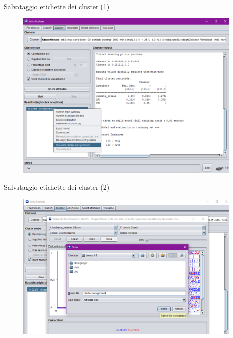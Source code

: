 \documentclass{beamer}
\begin{document}
\begin{frame}{Salvataggio etichette dei cluster (1)}
  \begin{figure}[bt]
    \begin{center}
    \includegraphics[width = 1\textwidth]{../img/save-cluster-ass-1.pdf}
    \end{center}
  \end{figure}
\end{frame}

\begin{frame}{Salvataggio etichette dei cluster (2)}
  \begin{figure}[bt]
    \begin{center}
    \includegraphics[width = 1\textwidth]{../img/save-cluster-ass-2.pdf}
    \end{center}
  \end{figure}
\end{frame}
\end{document}
